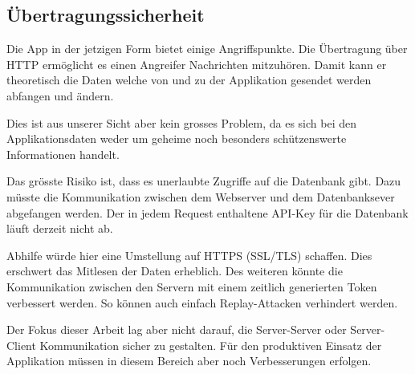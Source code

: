 \subsection{Übertragungssicherheit}
\label{uebertragunssicherheit}
Die App in der jetzigen Form bietet einige Angriffspunkte.
Die Übertragung über HTTP ermöglicht es einen Angreifer Nachrichten mitzuhören.
Damit kann er theoretisch die Daten welche von und zu der Applikation gesendet werden abfangen und ändern.

Dies ist aus unserer Sicht aber kein grosses Problem, da es sich bei den Applikationsdaten weder um geheime noch besonders schützenswerte Informationen handelt.

Das grösste Risiko ist, dass es unerlaubte Zugriffe auf die Datenbank gibt.
Dazu müsste die Kommunikation zwischen dem Webserver und dem Datenbanksever abgefangen werden.
Der in jedem Request enthaltene \gls{API}-Key für die Datenbank läuft derzeit nicht ab.

Abhilfe würde hier eine Umstellung auf HTTPS (SSL/TLS) schaffen.
Dies erschwert das Mitlesen der Daten erheblich.
Des weiteren könnte die Kommunikation zwischen den Servern mit einem zeitlich generierten Token verbessert werden.
So können auch einfach Replay-Attacken verhindert werden.

Der Fokus dieser Arbeit lag aber nicht darauf, die Server-Server oder Server-Client Kommunikation sicher zu gestalten.
Für den produktiven Einsatz der Applikation müssen in diesem Bereich aber noch Verbesserungen erfolgen.